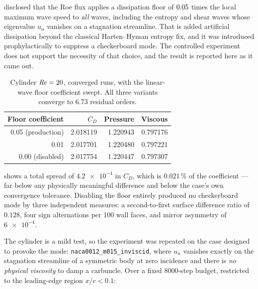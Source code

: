  disclosed that the Roe flux applies a dissipation
floor of $0.05$ times the local maximum wave speed to \emph{all} waves,
including the entropy and shear waves whose eigenvalue $u_n$ vanishes on a
stagnation streamline. That is added artificial dissipation beyond the classical
Harten--Hyman entropy fix, and it was introduced prophylactically to suppress a
checkerboard mode. The controlled experiment does not support the necessity of that
choice, and the result is reported here as it came out.

\begin{table}[htbp]
  \centering
  \caption{Cylinder $\mathit{Re}=20$, converged runs, with the linear-wave floor
  coefficient swept. All three variants converge to 6.73 residual orders.}
  \label{tab:floorsweep}
  \small
  \begin{tabular}{rrrr}
    \toprule
    Floor coefficient & $C_D$ & Pressure & Viscous \\
    \midrule
    \num{0.05} (production) & \num{2.018119} & \num{1.220943} & \num{0.797176} \\
    \num{0.01} & \num{2.017701} & \num{1.220480} & \num{0.797221} \\
    \num{0.00} (disabled) & \num{2.017754} & \num{1.220447} & \num{0.797307} \\
    \bottomrule
  \end{tabular}
\end{table}

 shows a total spread of $\num{4.2e-4}$ in $C_D$, which is
$0.021\,\%$ of the coefficient --- far below any physically meaningful difference and
below the case's own convergence tolerance. Disabling the floor entirely produced no
checkerboard mode by three independent measures: a second-to-first surface
difference ratio of $0.128$, four sign alternations per 100 wall faces, and mirror
asymmetry of $\num{6e-4}$.

The cylinder is a mild test, so the experiment was repeated on the case designed to
provoke the mode: \texttt{naca0012\_m015\_inviscid}, where $u_n$ vanishes exactly on
the stagnation streamline of a symmetric body at zero incidence and there is
\emph{no physical viscosity} to damp a carbuncle. Over a fixed \num{8000}-step
budget, restricted to the leading-edge region $x/c<0.1$:

